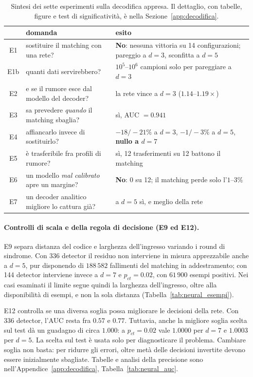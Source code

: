 \begin{onehalfspace}
\begin{table}[H]
\centering
\small
\begin{tabularx}{\textwidth}{cXX}
\toprule
 & \textbf{domanda} & \textbf{esito} \\
\midrule
E1 & sostituire il matching con una rete? & \textbf{No}: nessuna vittoria su 14 configurazioni; pareggio a $d=3$, sconfitta a $d=5$ \\
E1b & quanti dati servirebbero? & $10^5$--$10^6$ campioni solo per pareggiare a $d=3$ \\
E2 & e se il rumore esce dal modello del decoder? & la rete vince a $d=3$ ($1.14$--$1.19\times$) \\
E3 & sa prevedere \emph{quando} il matching sbaglia? & sì, \ac{AUC} $=0.941$ \\
E4 & affiancarlo invece di sostituirlo? & $-18/-21\%$ a $d=3$, $-1/-3\%$ a $d=5$, \textbf{nullo a $d=7$} \\
E5 & è trasferibile fra profili di rumore? & sì, 12 trasferimenti su 12 battono il matching \\
E6 & un modello \emph{mal calibrato} apre un margine? & \textbf{No}: 0 su 12; il matching perde solo l'$1$--$3\%$ \\
E7 & un decoder analitico migliore lo cattura già? & a $d=5$ sì, e meglio della rete \\
\bottomrule
\end{tabularx}
\caption[Sintesi della campagna sulla decodifica appresa]{Sintesi dei sette esperimenti sulla decodifica appresa. Il dettaglio, con tabelle, figure e test di significatività, è nella Sezione~\ref{app:decodifica}.}
\label{tab:sintesi_decodifica}
\end{table}

\paragraph{Controlli di scala e della regola di decisione (E9 ed E12).}
E9 separa distanza del codice e larghezza dell'ingresso variando i round
di sindrome. Con 336 detector il residuo non interviene in misura
apprezzabile anche a $d=5$, pur disponendo di $188\,582$ fallimenti del
matching in addestramento; con 144 detector interviene invece a $d=7$
e $p_{ct}=0.02$, con $61\,900$ esempi positivi. Nei casi esaminati il
limite segue quindi la larghezza dell'ingresso, oltre alla disponibilità
di esempi, e non la sola distanza (Tabella~\ref{tab:neural_esempi}).

E12 controlla se una diversa soglia possa migliorare le decisioni della rete. Con 336 detector, l'AUC resta fra $0.57$ e $0.77$. Tuttavia, anche la migliore soglia scelta sul test dà un guadagno di circa $1.000$: a $p_{ct}=0.02$ vale $1.0000$ per $d=7$ e $1.0003$ per $d=5$. La scelta sul test è usata solo per diagnosticare il problema. Cambiare soglia non basta: per ridurre gli errori, oltre metà delle decisioni invertite devono essere inizialmente sbagliate. Tabelle e analisi della precisione sono nell'Appendice~\ref{app:decodifica}, Tabella~\ref{tab:neural_auc}.


\end{onehalfspace}
